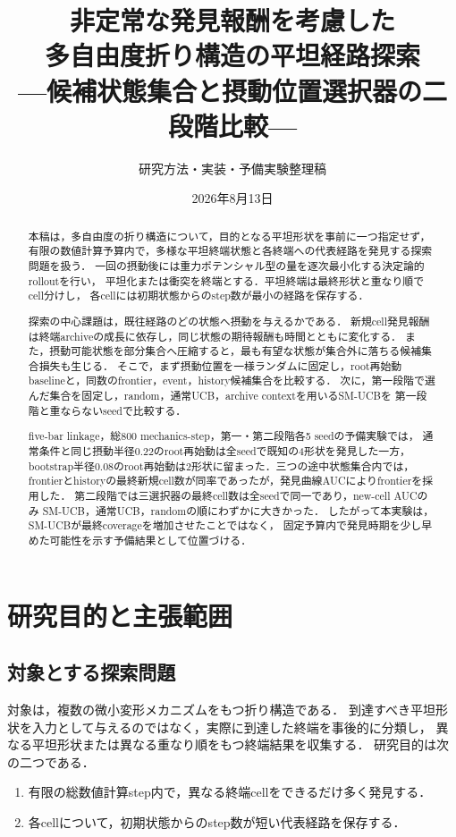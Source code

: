 \documentclass[a4paper,11pt]{ltjsarticle}
\title{非定常な発見報酬を考慮した\\
多自由度折り構造の平坦経路探索\\
---候補状態集合と摂動位置選択器の二段階比較---}
\author{研究方法・実装・予備実験整理稿}
\date{2026年8月13日}
\begin{document}
\maketitle

\begin{abstract}
本稿は，多自由度の折り構造について，目的となる平坦形状を事前に一つ指定せず，
有限の数値計算予算内で，多様な平坦終端状態と各終端への代表経路を発見する探索問題を扱う．
一回の摂動後には重力ポテンシャル型の量を逐次最小化する決定論的rolloutを行い，
平坦化または衝突を終端とする．平坦終端は最終形状と重なり順でcell分けし，
各cellには初期状態からのstep数が最小の経路を保存する．

探索の中心課題は，既往経路のどの状態へ摂動を与えるかである．
新規cell発見報酬は終端archiveの成長に依存し，同じ状態の期待報酬も時間とともに変化する．
また，摂動可能状態を部分集合へ圧縮すると，最も有望な状態が集合外に落ちる候補集合損失も生じる．
そこで，まず摂動位置を一様ランダムに固定し，root再始動baselineと，同数のfrontier，event，history候補集合を比較する．
次に，第一段階で選んだ集合を固定し，random，通常UCB，archive contextを用いるSM-UCBを
第一段階と重ならないseedで比較する．

five-bar linkage，総800 mechanics-step，第一・第二段階各5 seedの予備実験では，
通常条件と同じ摂動半径0.22のroot再始動は全seedで既知の4形状を発見した一方，
bootstrap半径0.08のroot再始動は2形状に留まった．三つの途中状態集合内では，
frontierとhistoryの最終新規cell数が同率であったが，発見曲線AUCによりfrontierを採用した．
第二段階では三選択器の最終cell数は全seedで同一であり，new-cell AUCのみ
SM-UCB，通常UCB，randomの順にわずかに大きかった．
したがって本実験は，SM-UCBが最終coverageを増加させたことではなく，
固定予算内で発見時期を少し早めた可能性を示す予備結果として位置づける．
\end{abstract}

\tableofcontents

\section{研究目的と主張範囲}
\label{sec:objective}

\subsection{対象とする探索問題}

対象は，複数の微小変形メカニズムをもつ折り構造である．
到達すべき平坦形状を入力として与えるのではなく，実際に到達した終端を事後的に分類し，
異なる平坦形状または異なる重なり順をもつ終端結果を収集する．
研究目的は次の二つである．
\begin{enumerate}
  \item 有限の総数値計算step内で，異なる終端cellをできるだけ多く発見する．
  \item 各cellについて，初期状態からのstep数が短い代表経路を保存する．
\end{enumerate}
\end{document}
